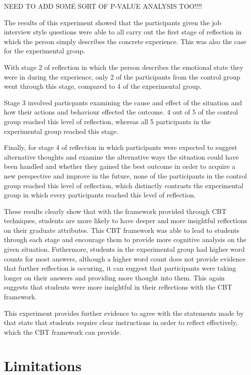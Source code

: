 \documentclass{l4proj}
\begin{document}
NEED TO ADD SOME SORT OF P-VALUE ANALYSIS TOO!!!!

The results of this experiment showed that the participants given the job interview style questions were able to all carry out the first stage of reflection
in which the person simply describes the concrete experience. This was also the case for the experimental group. 

With stage 2 of reflection in which the person describes the emotional state they were in during the experience, only 2 of the participants from the control 
group went through this stage, compared to 4 of the experimental group.

Stage 3 involved particpants examining the cause and effect of the situation and how their actions and behaviour effected the outcome. 4 out of 5 of the 
control group reached this level of reflection, whereas all 5 participants in the experimental group reached this stage.

Finally, for stage 4 of reflection in which participants were expected to suggest alternative thoughts and examine the alternative ways the situation could 
have been handled and whether they gained the best outcome in order to acquire a new perspective and improve in the future, none of the participants in the
control group reached this level of reflection, which distinctly contrasts the experimental group in which every participants reached this level of 
reflection.

These results clearly show that with the framework provided through CBT techniques, students are more likely to have deeper and more insightful reflections on 
their graduate attributes. This CBT framework was able to lead to students through each stage and encourage them to provide more cognitive analysis on the 
given situation. Futhermore, students in the experimental group had higher word counts for most answers, although a higher word count does not provide 
evidence that further reflection is occuring, it can suggest that participants were taking longer on their answers and providing more thought into them. 
This again suggests that students were more insightful in their reflections with the CBT framework.

This experiment provides further evidence to agree with the statements made by \citet{bruno_reflective_2018} that state that students require clear 
instructions in order to reflect effectively, which the CBT framework can provide.


\section{Limitations}
\end{document}
